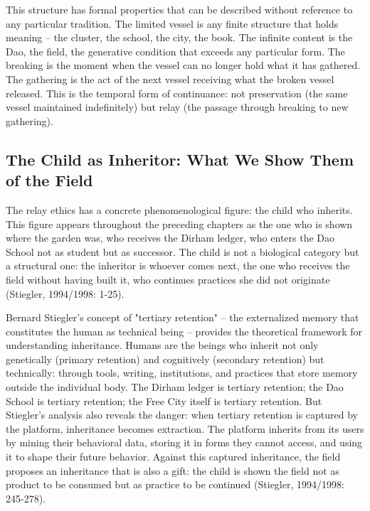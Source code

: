 This structure has formal properties that can be described without reference to any particular tradition. The limited vessel is any finite structure that holds meaning -- the cluster, the school, the city, the book. The infinite content is the Dao, the field, the generative condition that exceeds any particular form. The breaking is the moment when the vessel can no longer hold what it has gathered. The gathering is the act of the next vessel receiving what the broken vessel released. This is the temporal form of continuance: not preservation (the same vessel maintained indefinitely) but relay (the passage through breaking to new gathering).

\subsection{The Child as Inheritor: What We Show Them of the Field}

The relay ethics has a concrete phenomenological figure: the child who inherits. This figure appears throughout the preceding chapters as the one who is shown where the garden was, who receives the Dirham ledger, who enters the Dao School not as student but as successor. The child is not a biological category but a structural one: the inheritor is whoever comes next, the one who receives the field without having built it, who continues practices she did not originate (Stiegler, 1994/1998: 1-25).

Bernard Stiegler's concept of "tertiary retention" -- the externalized memory that constitutes the human as technical being -- provides the theoretical framework for understanding inheritance. Humans are the beings who inherit not only genetically (primary retention) and cognitively (secondary retention) but technically: through tools, writing, institutions, and practices that store memory outside the individual body. The Dirham ledger is tertiary retention; the Dao School is tertiary retention; the Free City itself is tertiary retention. But Stiegler's analysis also reveals the danger: when tertiary retention is captured by the platform, inheritance becomes extraction. The platform inherits from its users by mining their behavioral data, storing it in forms they cannot access, and using it to shape their future behavior. Against this captured inheritance, the field proposes an inheritance that is also a gift: the child is shown the field not as product to be consumed but as practice to be continued (Stiegler, 1994/1998: 245-278).

